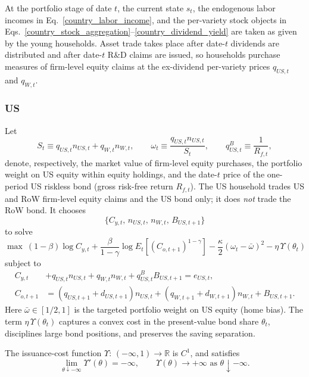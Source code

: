 \documentclass{article}
\begin{document}
At the portfolio stage of date $t$, the current state $s_t$, the endogenous labor incomes in Eq.~\eqref{country_labor_income}, and the per-variety stock objects in Eqs.~\eqref{country_stock_aggregation}--\eqref{country_dividend_yield} are taken as given by the young households. Asset trade takes place after date-$t$ dividends are distributed and after date-$t$ R\&D claims are issued, so households purchase measures of firm-level equity claims at the ex-dividend per-variety prices $q_{US,t}$ and $q_{W,t}$.

\subsubsection{US}

Let
\[
S_t \equiv q_{US,t}n_{US,t}+q_{W,t}n_{W,t},
\qquad
\omega_t \equiv \frac{q_{US,t}n_{US,t}}{S_t},
\qquad
q^B_{US,t}\equiv \frac{1}{R_{f,t}},
\]
denote, respectively, the market value of firm-level equity purchases, the portfolio weight on US equity within equity holdings, and the date-$t$ price of the one-period US riskless bond (gross risk-free return $R_{f,t}$). The US household trades US and RoW firm-level equity claims and the US bond only; it does \emph{not} trade the RoW bond. It chooses
\[
\{C_{y,t},\,n_{US,t},\,n_{W,t},\,B_{US,t+1}\}
\]
to solve
\[
\max
\ (1-\beta)\log C_{y,t}
+\frac{\beta}{1-\gamma}\log E_t\!\left[(C_{o,t+1})^{1-\gamma}\right]
-\frac{\kappa}{2}(\omega_t-\bar\omega)^2
-\eta\,\Upsilon(\theta_t)
\]
subject to
\begin{align*}
C_{y,t}
&+q_{US,t}n_{US,t}+q_{W,t}n_{W,t}
+q^B_{US,t}B_{US,t+1}
= e_{US,t},\\
C_{o,t+1}
&=
(q_{US,t+1}+d_{US,t+1})n_{US,t}
+(q_{W,t+1}+d_{W,t+1})n_{W,t}
+B_{US,t+1}.
\end{align*}
Here $\bar\omega\in[1/2,1]$ is the targeted portfolio weight on US equity (home bias). The term $\eta\,\Upsilon(\theta_t)$ captures a convex cost in the present-value bond share $\theta_t$, disciplines large bond positions, and preserves the saving separation.

\begin{ass}\label{ass_issuance_costs}
The issuance-cost function $\Upsilon:\,(-\infty,1)\to\mathbb R$ is $C^1$, and satisfies
\[
\lim_{\theta\downarrow -\infty}\Upsilon'(\theta)=-\infty,
\qquad
\Upsilon(\theta)\to+\infty \text{ as } \theta\downarrow -\infty.
\]
\end{ass}
\end{document}
